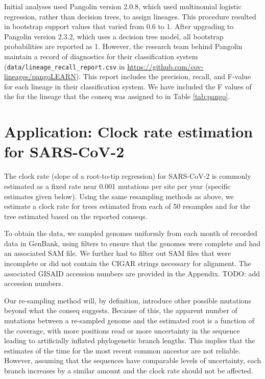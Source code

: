 \documentclass[10pt]{article}
\begin{document}
Initial analyses used Pangolin version 2.0.8, which used multinomial logistic regression, rather than decision trees, to assign lineages.
This procedure resulted in bootstrap support values that varied from 0.6 to 1.
After upgrading to Pangolin version 2.3.2, which uses a decision tree model, all bootstrap probabilities are reported as 1.
However, the research team behind Pangolin maintain a record of diagnostics for their classification system (\texttt{data/lineage\_recall\_report.csv} in \url{https://github.com/cov-lineages/pangoLEARN}).
This report includes the precision, recall, and F-value for each lineage in their classification system.
We have included the F values of the for the lineage that the conseq was assigned to in Table \ref{tab:pango}.



\section{Application: Clock rate estimation for SARS-CoV-2}

The clock rate (slope of a root-to-tip regression) for SARS-CoV-2 is commonly estimated as a fixed rate near 0.001 mutations per site per year (specific estimates given below).
Using the same resampling methods as above, we estimate a clock rate for trees estimated from each of 50 resamples and for the tree estimated based on the reported conseqs.

To obtain the data, we sampled genomes uniformly from each month of recorded data in GenBank, using filters to ensure that the genomes were complete and had an associated SAM file.
We further had to filter out SAM files that were incomplete or did not contain the CIGAR strings necessary for alignment.
The associated GISAID accession numbers are provided in the Appendix. TODO: add accession numbers.

Our re-sampling method will, by definition, introduce other possible mutations beyond what the conseq suggests.
Because of this, the apparent number of mutations between a re-sampled genome and the estimated root is a function of the coverage, with more positions read or more uncertainty in the sequence leading to artificially inflated phylogenetic branch lengths.
This implies that the estimates of the time for the most recent common ancestor are not reliable.
However, assuming that the sequences have comparable levels of uncertainty, each branch increases by a similar amount and the clock rate should not be affected. 
\end{document}
